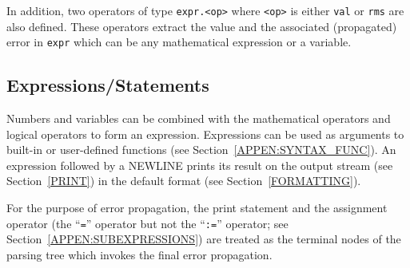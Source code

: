 \documentclass[11pt]{article}
\begin{document}
In addition, two operators of type {\tt expr.<op>} where {\tt <op>} is
either {\tt val} or {\tt rms} are also defined.  These operators
extract the value and the associated (propagated) error in {\tt expr}
which can be any mathematical expression or a variable.


\subsection{Expressions/Statements}
\label{APPEN:SYNTAX_EXPR}

Numbers and variables can be combined with the mathematical operators
and logical operators to form an expression.  Expressions can be used
as arguments to built-in or user-defined functions (see
Section~\ref{APPEN:SYNTAX_FUNC}).  An expression followed by a NEWLINE
prints its result on the output stream (see Section~\ref{PRINT}) in
the default format (see Section~\ref{FORMATTING}).

For the purpose of error propagation, the print statement and the
assignment operator (the ``{\tt =}'' operator but not the ``{\tt :=}''
operator; see Section~\ref{APPEN:SUBEXPRESSIONS}) are treated as the
terminal nodes of the parsing tree which invokes the final error
propagation.
\end{document}
